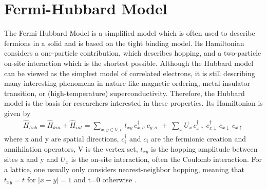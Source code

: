 \section{Fermi-Hubbard Model}
The Fermi-Hubbard Model is a simplified model which is often used to describe fermions in a solid and is based on the tight binding model. Its Hamiltonian considers a one-particle contribution, which describes hopping, and a two-particle on-site interaction which is the shortest possible. Although the Hubbard model can be viewed as the simplest model of correlated electrons, it is still describing many interesting phenomena in nature like magnetic ordering, metal-insulator transition, or (high-temperature) superconductivity. Therefore, the Hubbard model is the basis for researchers interested in these properties. Its Hamiltonian is given by
\begin{align}
    \hat{H}_{hub} = \hat{H}_{kin} + \hat{H}_{int} = \sum_{x,y\in V,\sigma} t_{xy}\,c_{x,\sigma}^\dagger\,c_{y,\sigma}
\;+\;\sum_x U_x\,c_{x\uparrow}^\dagger\,c_{x\downarrow}^\dagger\,c_{x\downarrow}\,c_{x\uparrow} 
\end{align}
where x and y are spatial directions, $c_i^\dagger$ and $c_i$ are the fermionic creation and annihilation operators, V is the vertex set, $t_{xy}$ is the hopping amplitude between sites x and y and $U_x$ is the on-site interaction, often the Coulomb interaction. For a lattice, one usually only considers nearest-neighbor hopping, meaning that $t_{xy}=t$ for $|x-y|=1$ and t=0 otherwise \cite{hubbardmielke}.

